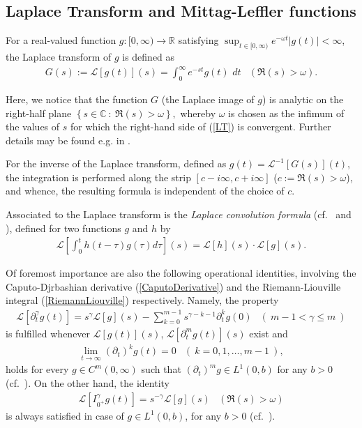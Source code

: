 \documentclass{amsart}
\theoremstyle{definition}
\theoremstyle{remark}
\numberwithin{equation}{section}
\newcommand{\BC}{{\mathbb C}}
\begin{document}
\subsection{Laplace Transform and Mittag-Leffler functions}\label{MittagLefflerFRAC}


For a real-valued function $g:[0,\infty)\rightarrow \mathbb{R}$ satisfying  $\displaystyle \sup_{t \in [0,\infty)} e^{-\omega t}| g(t)| <\infty$, the Laplace transform of $g$ is defined as
\begin{eqnarray}
	\label{LT} G(s):=\mathcal{L} [g(t)](s)=
	\int_{0}^{\infty} e^{-st} g(t) \, \, dt &  (\Re(s)>\omega).
\end{eqnarray}


Here, we notice that the function $G$ (the Laplace image of $g$) is analytic on the right-half plane $\displaystyle \left\{s\in \BC~:~\Re(s)>\omega\right\},$ whereby $\omega$ is chosen as the infimum of the values of $s$ for which the right-hand side of (\ref{LT}) is convergent. Further details may be found e.g. in \cite[Subsection 1.2]{KST06}.

For the inverse of the Laplace transform, defined as $g(t)=\mathcal{L}^{-1} [G(s)](t)$, the integration is performed along the strip $[c-i\infty,c+i\infty]$ ($c:=\Re(s)>\omega$), and whence, the resulting formula is independent of the choice of $c$. 

Associated to the Laplace transform is the {\it Laplace convolution formula} (cf.~\cite[(1.4.10), (1.4.12) of p. 19]{KST06} and \cite[(2.237), (2.238) of pp. 103--104]{Podlubny99}), defined for two functions $g$ and $h$ by 
\begin{eqnarray}
	\label{LaplaceConvolution} \mathcal{L}\left[\int_0^t h(t-\tau)g(\tau ) d\tau \right](s)=\mathcal{L}[h](s)\cdot\mathcal{L}[g](s).
\end{eqnarray}

Of foremost importance are also the following operational identities, involving the Caputo-Djrbashian derivative (\ref{CaputoDerivative}) and the Riemann-Liouville integral (\ref{RiemannLiouville}) respectively. Namely, the property
\begin{eqnarray}
	\label{LaplaceCaputo} \mathcal{L}[\partial_t^\gamma g(t)]=s^{\gamma}\mathcal{L}[g](s)-\sum_{k=0}^{m-1}s^{\gamma-k-1}\partial_t^k g(0) & \left(~m-1<\gamma\leq m~\right)
\end{eqnarray}
is fulfilled whenever $\mathcal{L}[g(t)](s)$, $\mathcal{L}[\partial_t^m g(t)](s)$ exist and
\begin{eqnarray*}
	\displaystyle \lim_{t \rightarrow \infty}\left(\partial_t\right)^k g(t)=0 &\left(~k=0,1,\ldots,m-1~\right),
\end{eqnarray*}
holds for every $g\in C^m(0,\infty)$ such that $\left(\partial_t\right)^mg\in L^1(0,b)$ for any $b>0$ (cf.~\cite[Lemma 2.24]{KST06}).
On the other hand, the identity
\begin{eqnarray}
	\label{LaplaceRLiouville}  \mathcal{L}[I_{0^+}^{\gamma} g(t)]=s^{-\gamma}\mathcal{L}[g](s) & (\Re(s)>\omega)
\end{eqnarray}
is always satisfied in case of $g\in L^1(0,b)$, for any $b>0$ (cf.~\cite[Lemma 2.14]{KST06}).
\end{document}
